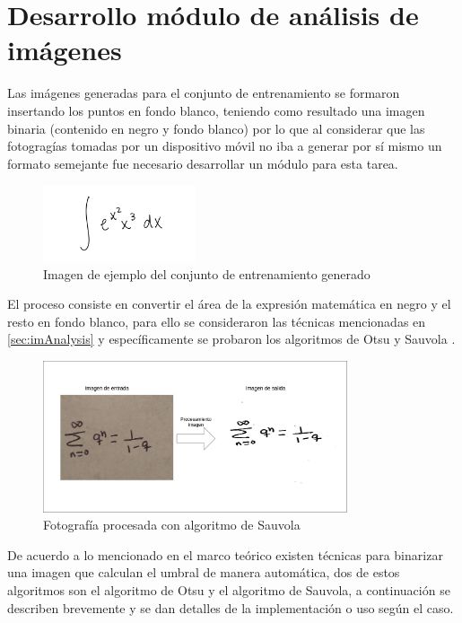 \section{Desarrollo módulo de análisis de imágenes}

Las imágenes generadas para el conjunto de entrenamiento se formaron insertando los puntos en fondo blanco, teniendo como resultado una imagen binaria (contenido en negro y fondo blanco) por lo que al considerar que las fotogragías tomadas por un dispositivo móvil no iba a generar por sí mismo un formato semejante fue necesario desarrollar un módulo para esta tarea.

\begin{figure}[h]
	\centering
	\includegraphics[width=0.4\textwidth]{capitulo5/imageprocessor/example_dataset.png}
	\caption{Imagen de ejemplo del conjunto de entrenamiento generado}
	\label{fig:example_dataset}
\end{figure}

El proceso consiste en convertir el área de la expresión matemática en negro y el resto en fondo blanco, para ello se consideraron las técnicas mencionadas en \ref{sec:imAnalysis}
 y específicamente se probaron los algoritmos de Otsu y Sauvola \cite{inproceedings}.
 
\begin{figure}[h]
	\centering
	\includegraphics[width=0.8\textwidth]{capitulo5/imageprocessor/IO_image.jpg}
	\caption{Fotografía procesada con algoritmo de Sauvola}
	\label{fig:process_image}
\end{figure}

De acuerdo a lo mencionado en el marco teórico existen técnicas para binarizar una imagen que calculan el umbral de manera automática, dos de estos algoritmos son el algoritmo de Otsu y el algoritmo de Sauvola, a continuación se describen brevemente y se dan detalles de la implementación o uso según el caso.

